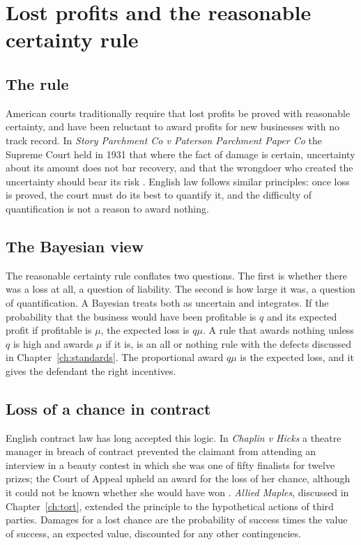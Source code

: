 \section{Lost profits and the reasonable certainty rule}

\subsection{The rule}

American courts traditionally require that lost profits be proved with reasonable certainty, and have been reluctant to award profits for new businesses with no track record. In \emph{Story Parchment Co v Paterson Parchment Paper Co} the Supreme Court held in 1931 that where the fact of damage is certain, uncertainty about its amount does not bar recovery, and that the wrongdoer who created the uncertainty should bear its risk \citep{storyparchment1931}. English law follows similar principles: once loss is proved, the court must do its best to quantify it, and the difficulty of quantification is not a reason to award nothing.

\subsection{The Bayesian view}

The reasonable certainty rule conflates two questions. The first is whether there was a loss at all, a question of liability. The second is how large it was, a question of quantification. A Bayesian treats both as uncertain and integrates. If the probability that the business would have been profitable is $q$ and its expected profit if profitable is $\mu$, the expected loss is $q\mu$. A rule that awards nothing unless $q$ is high and awards $\mu$ if it is, is an all or nothing rule with the defects discussed in Chapter~\ref{ch:standards}. The proportional award $q\mu$ is the expected loss, and it gives the defendant the right incentives.

\subsection{Loss of a chance in contract}

English contract law has long accepted this logic. In \emph{Chaplin v Hicks} a theatre manager in breach of contract prevented the claimant from attending an interview in a beauty contest in which she was one of fifty finalists for twelve prizes; the Court of Appeal upheld an award for the loss of her chance, although it could not be known whether she would have won \citep{chaplin1911}. \emph{Allied Maples}, discussed in Chapter~\ref{ch:tort}, extended the principle to the hypothetical actions of third parties. Damages for a lost chance are the probability of success times the value of success, an expected value, discounted for any other contingencies.


